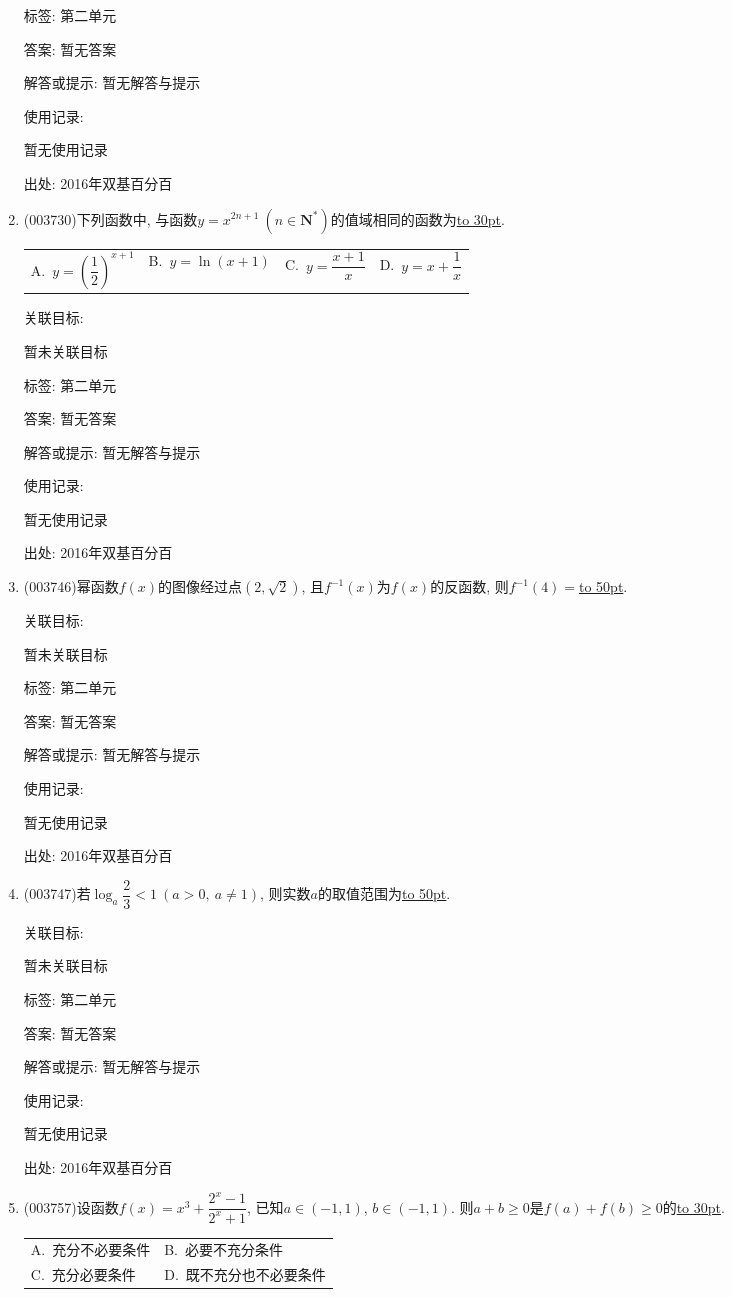 \documentclass[10pt,a4paper]{article}
\newcommand{\blank}[1]{\underline{\hbox to #1pt{}}}
\newcommand{\twoch}[4]{\par\begin{tabular}{p{.46\textwidth}p{.46\textwidth}}
A.~#1& B.~#2\\
C.~#3& D.~#4
\end{tabular}}
\newcommand{\fourch}[4]{\par\begin{tabular}{p{.23\textwidth}p{.23\textwidth}p{.23\textwidth}p{.23\textwidth}}
A.~#1 &B.~#2& C.~#3& D.~#4
\end{tabular}}
\begin{document}
\begin{enumerate}[1.]
标签: 第二单元

答案: 暂无答案

解答或提示: 暂无解答与提示

使用记录:

暂无使用记录


出处: 2016年双基百分百
\item { (003730)}下列函数中, 与函数$y=x^{2n+1} \ (n\in \mathbf{N}^*)$的值域相同的函数为\blank{30}.
\fourch{$y=\left(\dfrac 12\right)^{x+1}$}{$y=\ln(x+1)$}{$y=\dfrac{x+1}{x}$}{$y=x+\dfrac 1x$}


关联目标:

暂未关联目标



标签: 第二单元

答案: 暂无答案

解答或提示: 暂无解答与提示

使用记录:

暂无使用记录


出处: 2016年双基百分百
\item { (003746)}幂函数$f(x)$的图像经过点$(2,\sqrt{2})$, 且$f^{-1}(x)$为$f(x)$的反函数, 则$f^{-1}(4)=$\blank{50}.


关联目标:

暂未关联目标



标签: 第二单元

答案: 暂无答案

解答或提示: 暂无解答与提示

使用记录:

暂无使用记录


出处: 2016年双基百分百
\item { (003747)}若$\log_a \dfrac 23<1 \ (a>0, \ a\ne 1)$, 则实数$a$的取值范围为\blank{50}.


关联目标:

暂未关联目标



标签: 第二单元

答案: 暂无答案

解答或提示: 暂无解答与提示

使用记录:

暂无使用记录


出处: 2016年双基百分百
\item { (003757)}设函数$f(x)=x^3+\dfrac{2^x-1}{2^x+1}$, 已知$a\in (-1,1)$, $b\in (-1,1)$. 则$a+b\ge 0$是$f(a)+f(b)\ge 0$的\blank{30}.
\twoch{充分不必要条件}{必要不充分条件}{充分必要条件}{既不充分也不必要条件}



\end{enumerate}
\end{document}
